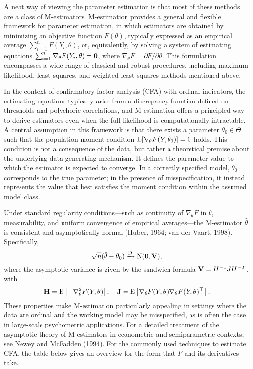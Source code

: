 \documentclass[
  letterpaper,
  DIV=11,
  numbers=noendperiod]{scrartcl}
\begin{document}
A neat way of viewing the parameter estimation is that most of these
methods are a class of M-estimators. M-estimation provides a general and
flexible framework for parameter estimation, in which estimators are
obtained by minimizing an objective function \(F(\theta)\), typically
expressed as an empirical average \(\sum_{i=1}^n F(Y_i, \theta)\), or,
equivalently, by solving a system of estimating equations
\(\sum_{i=1}^n \nabla_\theta F(Y_i, \theta) = {\mathbf 0}\), where
\(\nabla_\theta F = \partial F / \partial \theta\). This formulation
encompasses a wide range of classical and robust procedures, including
maximum likelihood, least squares, and weighted least squares methods
mentioned above.

In the context of confirmatory factor analysis (CFA) with ordinal
indicators, the estimating equations typically arise from a discrepancy
function defined on thresholds and polychoric correlations, and
M-estimation offers a principled way to derive estimators even when the
full likelihood is computationally intractable. A central assumption in
this framework is that there exists a parameter \(\theta_0 \in \Theta\)
such that the population moment condition
\(\operatorname{E}[\nabla_\theta F(Y, \theta_0)] = 0\) holds. This condition is not a
consequence of the data, but rather a theoretical premise about the
underlying data-generating mechanism. It defines the parameter value to
which the estimator is expected to converge. In a correctly specified
model, \(\theta_0\) corresponds to the true parameter; in the presence
of misspecification, it instead represents the value that best satisfies
the moment condition within the assumed model class.

Under standard regularity conditions---such as continuity of
\(\nabla_\theta F\) in \(\theta\), measurability, and uniform
convergence of empirical averages---the M-estimator \(\hat\theta\) is
consistent and asymptotically normal (Huber, 1964; van der Vaart, 1998).
Specifically, \[
\sqrt{n}(\hat\theta - \theta_0) \xrightarrow{\text D} \operatorname{N}({\mathbf 0}, {\mathbf V}),
\] where the asymptotic variance is given by the sandwich formula
\({\mathbf V} = H^{-1} J H^{-T}\), with \[
{\mathbf H} = \operatorname{E} \left[ - \nabla_\theta^2 F(Y,\theta) \right], \quad
{\mathbf J} = \operatorname{E} \left[ \nabla_\theta F(Y,\theta) \nabla_\theta F(Y,\theta) ^\top \right].
\] These properties make M-estimation particularly appealing in settings
where the data are ordinal and the working model may be misspecified, as
is often the case in large-scale psychometric applications. For a
detailed treatment of the asymptotic theory of M-estimators in
econometric and semiparametric contexts, see Newey and McFadden (1994).
For the commonly used techniques to estimate CFA, the table below gives
an overview for the form that \(F\) and its derivatives take.
\end{document}
